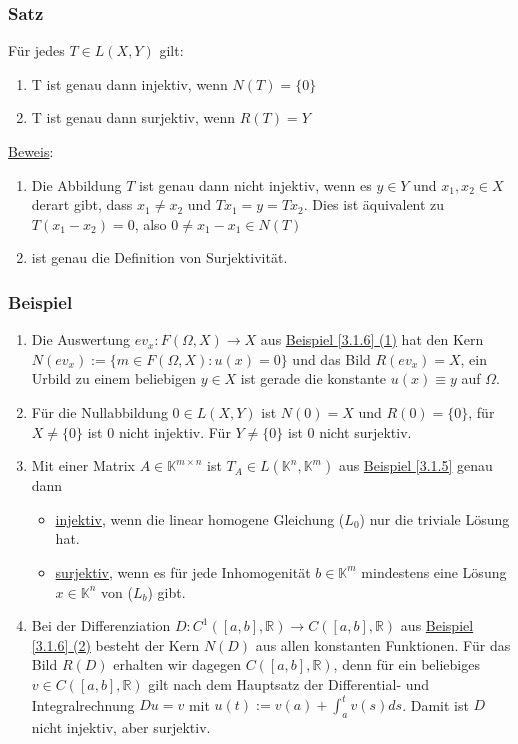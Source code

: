 \subsubsection{Satz}
\label{3.1.10}
Für jedes $T\in L(X,Y)$ gilt:
\renewcommand{\labelenumi}{(\alph{enumi})}
\begin{enumerate}
\item T ist genau dann injektiv, wenn $N(T)=\{0\}$
\item T ist genau dann surjektiv, wenn $R(T)=Y$
\end{enumerate}
\underline{Beweis}:
\begin{enumerate}
\item Die Abbildung $T$ ist genau dann nicht injektiv, wenn es $y\in Y$ und $x_1,x_2\in X$ derart gibt, dass $x_1\not= x_2$ und $Tx_1=y=Tx_2$.  Dies ist äquivalent zu $T(x_1-x_2)=0$, also $0 \not= x_1-x_1 \in N(T)$
\item ist genau die Definition von Surjektivität.
\end{enumerate}
\subsubsection{Beispiel}
\renewcommand{\labelenumi}{(\arabic{enumi})}
\begin{enumerate}
\item Die Auswertung $ev_x:F(\Omega ,X)\rightarrow X$ aus \hyperref[3.1.6]{Beispiel \ref*{3.1.6} (1)} hat den Kern $N(ev_x):=\{m\in F(\Omega ,X):u(x)=0\}$ und das Bild $R(ev_x)=X$, ein Urbild zu einem beliebigen $y\in X$ ist gerade die konstante $u(x)\equiv y$ auf $\Omega$.
\item Für die Nullabbildung $0\in L(X,Y)$ ist $N(0)=X$ und $R(0)=\{0\}$, für $X\not= \{0\}$ ist $0$ nicht injektiv.  Für $Y\not= \{0\}$ ist $0$ nicht surjektiv.
\item Mit einer Matrix $A\in \mathbb{K}^{m\times n}$ ist $T_A\in L(\mathbb{K}^n,\mathbb{K}^m)$ aus \hyperref[3.1.5]{Beispiel \ref*{3.1.5}} genau dann
\begin{itemize}
\item \underline{injektiv}, wenn die linear homogene Gleichung ($L_0$) nur die triviale Lösung hat.
\item \underline{surjektiv}, wenn es für jede Inhomogenität $b\in\mathbb{K}^m$ mindestens eine Lösung $x\in\mathbb{K}^n$ von ($L_b$) gibt.
\end{itemize}
\item Bei der Differenziation $D:C^1([a,b],\mathbb{R})\rightarrow C([a,b],\mathbb{R})$ aus \hyperref[3.1.6]{Beispiel \ref*{3.1.6} (2)} besteht der Kern $N(D)$ aus allen konstanten Funktionen.  Für das Bild $R(D)$ erhalten wir dagegen $C([a,b],\mathbb{R})$, denn für ein beliebiges $v\in C([a,b],\mathbb{R})$ gilt nach dem Hauptsatz der Differential- und Integralrechnung $Du=v$ mit $u(t):=v(a)+\int_a^t v(s)ds$.  Damit ist $D$ nicht injektiv, aber surjektiv.
\end{enumerate}
